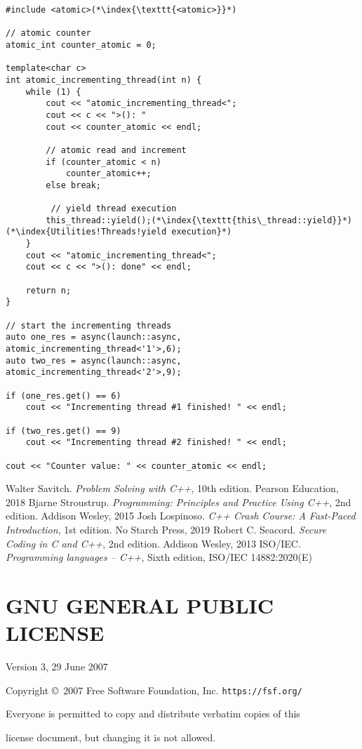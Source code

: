 \documentclass[10pt]{book}
\begin{document}
\begin{lstlisting}
#include <atomic>(*\index{\texttt{<atomic>}}*)

// atomic counter
atomic_int counter_atomic = 0;

template<char c>
int atomic_incrementing_thread(int n) {
    while (1) {
        cout << "atomic_incrementing_thread<";
        cout << c << ">(): " 
        cout << counter_atomic << endl;
        
        // atomic read and increment
        if (counter_atomic < n)
            counter_atomic++;
        else break;
        
         // yield thread execution
        this_thread::yield();(*\index{\texttt{this\_thread::yield}}*)(*\index{Utilities!Threads!yield execution}*)
    }
    cout << "atomic_incrementing_thread<";
    cout << c << ">(): done" << endl;
    
    return n;
}

// start the incrementing threads
auto one_res = async(launch::async, atomic_incrementing_thread<'1'>,6);
auto two_res = async(launch::async, atomic_incrementing_thread<'2'>,9);

if (one_res.get() == 6)
    cout << "Incrementing thread #1 finished! " << endl;
    
if (two_res.get() == 9)
    cout << "Incrementing thread #2 finished! " << endl;
    
cout << "Counter value: " << counter_atomic << endl;
\end{lstlisting}
%
%
\newpage

\renewcommand\refname{Bibliography}
\begin{thebibliography}{99}
 Walter Savitch. \textsl{Problem Solving with C++}, 10th edition. Pearson Education, 2018
 Bjarne Stroustrup. \textsl{Programming: Principles and Practice Using C++}, 2nd edition. Addison Wesley, 2015
 Josh Lospinoso. \textsl{C++ Crash Course: A Fast-Paced Introduction}, 1st edition. No Starch Press, 2019
 Robert C. Seacord. \textsl{Secure Coding in C and C++}, 2nd edition. Addison Wesley, 2013
 ISO/IEC. \textsl{Programming languages -- C++}, Sixth edition, ISO/IEC 14882:2020(E)
\end{thebibliography}
%
%
\appendix
\chapter{GNU GENERAL PUBLIC LICENSE}
\begin{center}
Version 3, 29 June 2007
\end{center}
\begin{center}
{\parindent 0in

Copyright \copyright\  2007 Free Software Foundation, Inc. \texttt{https://fsf.org/}

\bigskip
Everyone is permitted to copy and distribute verbatim copies of this

license document, but changing it is not allowed.}

\end{center}
\end{document}
